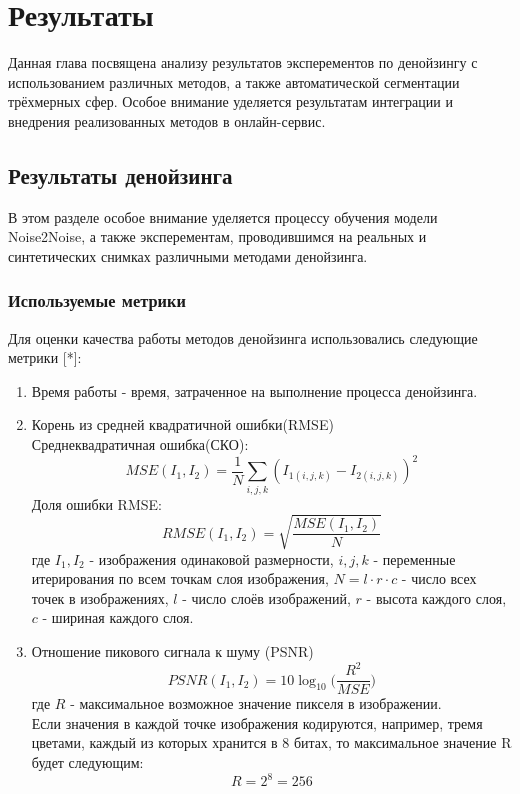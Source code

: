 \chapter{Результаты} \label{ch3}
\par Данная глава посвящена анализу результатов эксперементов по денойзингу с использованием различных методов, а также автоматической сегментации трёхмерных сфер. Особое внимание уделяется результатам интеграции и внедрения реализованных методов в онлайн-сервис.
\section{Результаты денойзинга}
\par В этом разделе особое внимание уделяется процессу обучения модели Noise2Noise, а также эксперементам, проводившимся на реальных и синтетических снимках различными методами денойзинга.
\subsection{Используемые метрики}
\par Для оценки качества работы методов денойзинга использовались следующие метрики [*]:
\begin{enumerate}
	\item Время работы - время, затраченное на выполнение процесса денойзинга.
	\item Корень из средней квадратичной ошибки(RMSE)\\
	Среднеквадратичная ошибка(СКО):
	\begin{equation}
		MSE(I_1, I_2) = \frac{1}{N} \sum_{i,j,k}^{}(I_{1(i,j,k)} - I_{2(i,j,k)})^2
	\end{equation}
	Доля ошибки RMSE: 
	\begin{equation}
		RMSE(I_1, I_2) = \sqrt{\frac{MSE(I_1, I_2)}{N}}
	\end{equation}
	где $I_1, I_2$ - изображения одинаковой размерности, $i, j, k$ - переменные итерирования по всем точкам слоя изображения, $N = l \cdot r \cdot c$ - число всех точек в изображениях, $l$ - число слоёв изображений, $r$ - высота каждого слоя, $c$ - шириная каждого слоя.
	\item Отношение пикового сигнала к шуму (PSNR) 
	\begin{equation}
		PSNR(I_1, I_2) = 10\log_{10} \Big(\frac{R^2}{MSE}\Big)
	\end{equation}
	где $R$ - максимальное возможное значение пикселя в изображении.\\
	Если значения в каждой точке изображения кодируются, например, тремя цветами, каждый из которых хранится в 8 битах, то максимальное значение R будет следующим:
	\begin{equation}
		R = 2^8 = 256
	\end{equation}
\end{enumerate}

